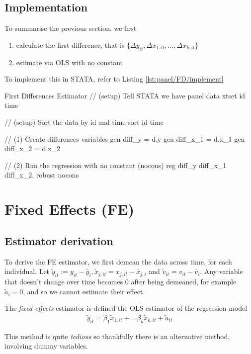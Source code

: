 		\subsection{Implementation}
			To summarise the previous section, we first
			\begin{enumerate}[(1)]
				\item calculate the first difference, that is $\{\Delta y_{it}, \Delta x_{1,it} ,\dots ,\Delta x_{k,it}\}$
				\item estimate via OLS with no constant
			\end{enumerate}
			To implement this in STATA, refer to Listing \ref{lst:panel/FD/implement}
			\begin{sexylisting}[colback=white, label=lst:panel/FD/implement]{First Differences Estimator}
//	(setup) Tell STATA we have panel data
	xtset id time

//	(setup) Sort the data by id and time
	sort id time

//	(1) Create differences variables
	gen diff_y = d.y
	gen diff_x_1 = d.x_1
	gen diff_x_2 = d.x_2

//	(2) Run the regression with no constant (nocons)
	reg diff_y diff_x_1 diff_x_2, robust nocons
			\end{sexylisting}
			
		\section{Fixed Effects (FE)}
			\subsection{Estimator derivation}
				To derive the FE estimator, we first demean the data across time, for each individual. Let $\tilde y_{it} := y_{it} - \bar y_{i}, \tilde x_{j,it} = x_{j,it}-\bar x_{j,i}$ and $\tilde v_{it} = v_{it}-\bar v_i$. Any variable that doesn’t change over time becomes 0 after being demeaned, for example $\tilde a_i = 0$, and so we cannot estimate their effect. 
				
				\begin{definition}
					The \textit{fixed effects }estimator is defined the OLS estimator of the regression model
					\begin{align}
						\tilde y_{it} = \beta_1\tilde x_{1,it}+\dots \beta_k\tilde x_{k,it} + \tilde u_{it}
					\end{align}
				\end{definition}
				This method is quite \textit{tedious} so thankfully there is an alternative method, involving dummy variables.
				

